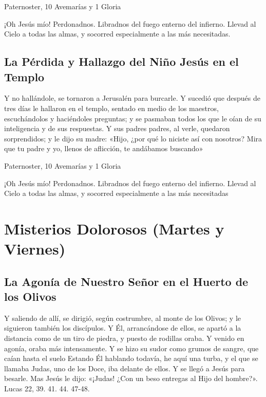 \documentclass[a4paper,11pt, oneside]{report}
\begin{document}
         Paternoster, 10 Avemarías y 1 Gloria
        
        \medskip
        ¡Oh Jesús mío! Perdonadnos. Libradnos del fuego enterno del infierno. Llevad al Cielo a todas las almas, y socorred especialmente a las más necesitadas.
              
      \subsection*{La Pérdida y Hallazgo del Niño Jesús en el Templo}
        Y no hallándole, se tornaron a Jerusalén para burcarle. Y sucedió que después de tres días le hallaron en el templo, sentado en medio de los maestros,
        escuchándolos y haciéndoles preguntas; y se pasmaban todos los que le oían de su inteligencia y de sus respuestas. Y sus padres padres, al verle, quedaron
        sorprendidos; y le dijo su madre: «Hijo, ¿por qué lo niciste así con nosotros? Mira que tu padre y yo, llenos de aflicción, te andábamos buscando»
        
         Paternoster, 10 Avemarías y 1 Gloria
        
        \medskip
        ¡Oh Jesús mío! Perdonadnos. Libradnos del fuego enterno del infierno. Llevad al Cielo a todas las almas, y socorred especialmente a las más 
        necesitadas

    \section*{Misterios Dolorosos (Martes y Viernes)}
      
      \subsection*{La Agonía de Nuestro Señor en el Huerto de los Olivos}
        Y saliendo de allí, se dirigió, según costrumbre, al monte de los Olivos; y le siguieron también los discípulos.
        Y Él, arrancándose de ellos, se apartó a la distancia como de un tiro de piedra, y puesto de rodillas oraba. 
        Y venido en agonía, oraba más intensamente. Y se hizo su sudor como grumos de sangre, que caían hasta el suelo
        Estando Él hablando todavía, he aquí una turba, y el que se llamaba Judas, uno de los Doce, iba delante de ellos. Y se llegó a Jesús para besarle.
        Mas Jesús le dijo: «¡Judas! ¿Con un beso entregas al Hijo del hombre?». Lucas 22, 39. 41. 44. 47-48.
\end{document}
